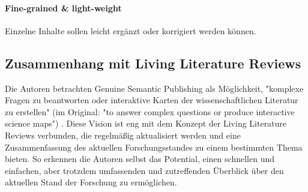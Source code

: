 \paragraph{Fine-grained \& light-weight}
\label{par:fine-grained-light-weight}
Einzelne Inhalte sollen leicht ergänzt oder korrigiert werden können.

\subsection{Zusammenhang mit Living Literature Reviews}
\label{subsec:zusammenhang-mit-living-literature-reviews}

Die Autoren betrachten Genuine Semantic Publishing als Möglichkeit, "komplexe Fragen zu beantworten oder interaktive Karten der wissenschaftlichen Literatur zu erstellen" (im Original: "to answer complex questions or produce interactive science maps") \cite{kuhn2017genuine}.
Diese Vision ist eng mit dem Konzept der Living Literature Reviews verbunden, die regelmäßig aktualisiert werden und eine Zusammenfassung des aktuellen Forschungsstandes zu einem bestimmten Thema bieten.
So erkennen die Autoren selbst das Potential, einen schnellen und einfachen, aber trotzdem umfassenden und zutreffenden Überblick über den aktuellen Stand der Forschung zu ermöglichen.
